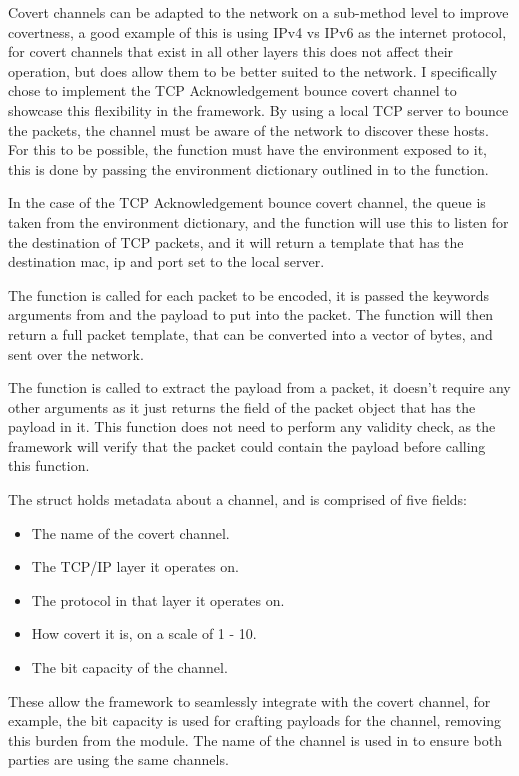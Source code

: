 Covert channels can be adapted to the network on a sub-method level to improve covertness, a good example of this is using IPv4 vs IPv6 as the internet protocol, for covert channels that exist in all other layers this does not affect their operation, but does allow them to be better suited to the network. I specifically chose to implement the TCP Acknowledgement bounce covert channel to showcase this flexibility in the framework. By using a local TCP server to bounce the packets, the channel must be aware of the network to discover these hosts. For this to be possible, the  function must have the environment exposed to it, this is done by passing the environment dictionary outlined in  to the  function.

In the case of the TCP Acknowledgement bounce covert channel, the queue is taken from the environment dictionary, and the  function will use this to listen for the destination of TCP packets, and it will return a template that has the destination mac, ip and port set to the local server.

The  function is called for each packet to be encoded, it is passed the keywords arguments from  and the payload to put into the packet. The function will then return a full packet template, that can be converted into a vector of bytes, and sent over the network.

The  function is called to extract the payload from a packet, it doesn't require any other arguments as it just returns the field of the packet object that has the payload in it. This function does not need to perform any validity check, as the framework will verify that the packet could contain the payload before calling this function.

The  struct holds metadata about a channel, and is comprised of five fields:
\begin{itemize}
    \item The name of the covert channel.
    \item The TCP/IP layer it operates on.
    \item The protocol in that layer it operates on.
    \item How covert it is, on a scale of 1 - 10.
    \item The bit capacity of the channel.
\end{itemize}
\label{itm:covert_method}

These allow the framework to seamlessly integrate with the covert channel, for example, the bit capacity is used for crafting payloads for the channel, removing this burden from the module. The name of the channel is used in  to ensure both parties are using the same channels.

